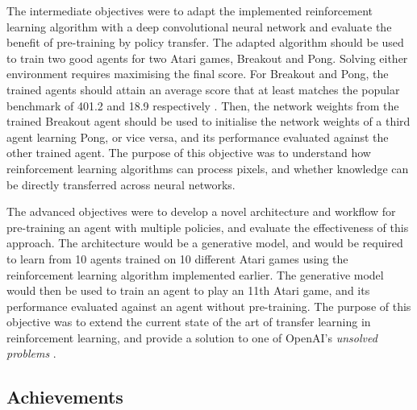 \documentclass[12pt,a4paper]{article}
\begin{document}
The intermediate objectives were to adapt the implemented reinforcement learning algorithm with a deep convolutional neural network and evaluate the benefit of pre-training by policy transfer. The adapted algorithm should be used to train two good agents for two Atari games, Breakout and Pong. Solving either environment requires maximising the final score. For Breakout and Pong, the trained agents should attain an average score that at least matches the popular benchmark of 401.2 and 18.9 respectively \cite{}. Then, the network weights from the trained Breakout agent should be used to initialise the network weights of a third agent learning Pong, or vice versa, and its performance evaluated against the other trained agent. The purpose of this objective was to understand how reinforcement learning algorithms can process pixels, and whether knowledge can be directly transferred across neural networks.

The advanced objectives were to develop a novel architecture and workflow for pre-training an agent with multiple policies, and evaluate the effectiveness of this approach. The architecture would be a generative model, and would be required to learn from 10 agents trained on 10 different Atari games using the reinforcement learning algorithm implemented earlier. The generative model would then be used to train an agent to play an 11th Atari game, and its performance evaluated against an agent without pre-training. The purpose of this objective was to extend the current state of the art of transfer learning in reinforcement learning, and provide a solution to one of OpenAI's \textit{unsolved problems} \cite{}.

\subsection{Achievements}
\end{document}
